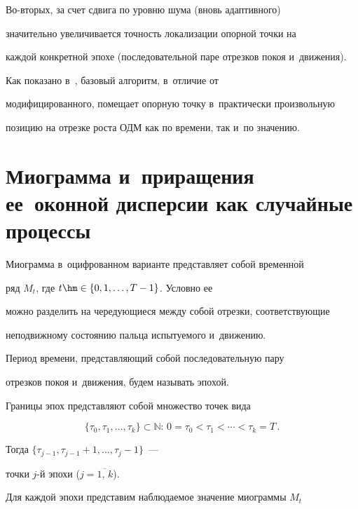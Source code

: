 Во-вто\-рых, за счет сдвига по уровню шума (вновь адаптивного)


значительно увеличивается точность локализации опорной точки на


каждой конкретной эпохе (последовательной паре отрезков покоя и~движения).


Как показано в~\cite{bi_4}, базовый алгоритм, в~отличие от


модифицированного, помещает опорную точку в~практически произвольную


позицию на отрезке роста ОДМ как по времени, так и~по значению.








\section{Миограмма и~приращения ее~оконной дисперсии как случайные процессы}





Миограмма в~оцифрованном варианте представляет собой временн$\acute{\mbox{о}}$й


ряд $M_t$, где $t \hm\in \{0 ,  1 , \ldots ,  T-1\}$. Условно ее


можно разделить на чередующиеся между собой отрезки, соответствующие


неподвижному состоянию пальца испытуемого и~движению.


Период времени, представляющий собой последовательную пару


отрезков покоя и~движения, будем называть эпохой.


Границы эпох представляют собой множество точек вида


\begin{equation*}


    \{\tau_0 , \tau_1 , \ldots ,\tau_k\} \subset \mathbb{N} \mbox{: } 0 =


    \tau_0 < \tau_1 < \cdots < \tau_k = T\,.


\end{equation*}


Тогда $\{\tau_{j-1} , \tau_{j-1} + 1 , \ldots , \tau_{j} - 1\}$~---


точки $j$-й эпохи ($j=\overline{1,\,k}$).





Для каждой эпохи представим наблюдаемое значение миограммы $M_t$


